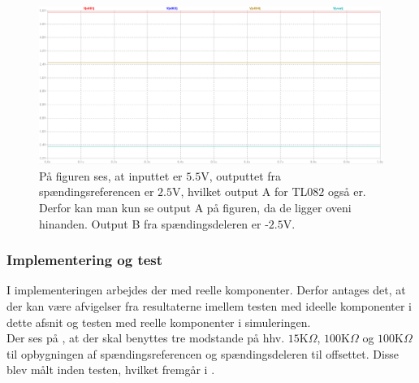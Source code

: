 \begin{figure}[H]
	\centering
	\includegraphics[scale=.3]{figures/cProblemloesning/Reference_sim_kompar.PNG}
	\caption{På figuren ses, at inputtet er $5.5$V, outputtet fra spændingsreferencen er $2.5$V, hvilket output A for TL$082$ også er. Derfor kan man kun se output A på figuren, da de ligger oveni hinanden. Output B fra spændingsdeleren er -$2.5$V.}
	\label{fig:Spaendingsreference_komparator_sim}
\end{figure}
\subsubsection{Implementering og test}
I implementeringen arbejdes der med reelle komponenter. Derfor antages det, at der kan være afvigelser fra resultaterne imellem testen med ideelle komponenter i dette afsnit og testen med reelle komponenter i simuleringen. \\
Der ses på , at der skal benyttes tre modstande på hhv. $15$K$\Omega$, $100$K$\Omega$ og $100$K$\Omega$ til opbygningen af spændingsreferencen og spændingsdeleren til offsettet. Disse blev målt inden testen, hvilket fremgår i .

